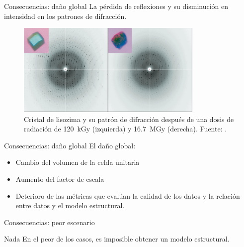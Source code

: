 \documentclass{beamer}
\begin{document}
\begin{frame}{Consecuencias: daño global}
\label{teng}	
La pérdida de reflexiones y su disminución en intensidad en los patrones de difracción. 
 \begin{figure}[h]
  \centering
  \includegraphics[width=0.8\textwidth]{teng.png}
  \caption{Cristal de lisozima y su patrón de difracción después de una dosis de radiación de \SI{120}{\kilo\gray} (izquierda) y \SI{16.7}{\mega\gray} (derecha). Fuente: \cite{Teng2000}. %
}
  \label{fig:teng2000}
 \end{figure}
\end{frame}
\begin{frame}{Consecuencias: daño global}
El daño global:
 \begin{itemize}
  \item Cambio del volumen de la celda unitaria
  \item Aumento del factor de escala
  \item Deterioro de las métricas que evalúan la calidad de los datos y la relación entre datos y el modelo estructural. 
 \end{itemize}
\end{frame}
\begin{frame}{Consecuencias: peor escenario}
 \begin{alertblock}{Nada}
En el peor de los casos, es imposible obtener un modelo estructural.
 \end{alertblock}
\end{frame}
\end{document}
